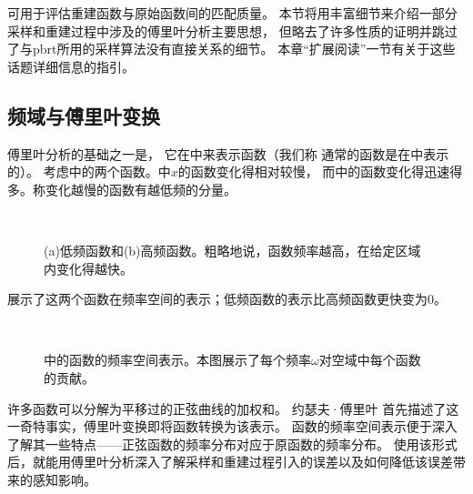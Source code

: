 可用于评估重建函数与原始函数间的匹配质量。
本节将用丰富细节来介绍一部分采样和重建过程中涉及的傅里叶分析主要思想，
但略去了许多性质的证明并跳过了与pbrt所用的采样算法没有直接关系的细节。
本章“扩展阅读”一节有关于这些话题详细信息的指引。

\subsection{频域与傅里叶变换}\label{sub:频域与傅里叶变换}
傅里叶分析的基础之一是，
它在中来表示函数（我们称
通常的函数是在中表示的）。
考虑中的两个函数。中$x$的函数变化得相对较慢，
而中的函数变化得迅速得多。称变化越慢的函数有越低频的分量。
\begin{figure}[htbp]
    \centering
    \,\,\,\,
    \caption{(a)低频函数和(b)高频函数。粗略地说，函数频率越高，在给定区域内变化得越快。}
    \label{fig:7.2}
\end{figure}

展示了这两个函数在频率空间的表示；低频函数的表示比高频函数更快变为0。
\begin{figure}[htbp]
    \centering
    \,\,\,\,
    \caption{中的函数的频率空间表示。本图展示了每个频率$\omega$对空域中每个函数的贡献。}
    \label{fig:7.3}
\end{figure}

许多函数可以分解为平移过的正弦曲线的加权和。
约瑟夫·傅里叶
首先描述了这一奇特事实，傅里叶变换即将函数转换为该表示。
函数的频率空间表示便于深入了解其一些特点——正弦函数的频率分布对应于原函数的频率分布。
使用该形式后，就能用傅里叶分析深入了解采样和重建过程引入的误差以及如何降低该误差带来的感知影响。

